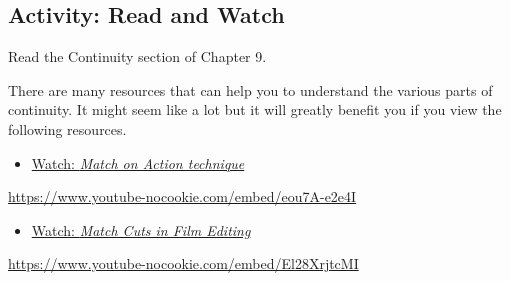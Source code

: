 \documentclass[
  letterpaper,
  DIV=11,
  numbers=noendperiod]{scrreprt}
\providecommand{\tightlist}{%
  \setlength{\itemsep}{0pt}\setlength{\parskip}{0pt}}\usepackage{longtable,booktabs,array}
\begin{document}
\subsection{Activity: Read and Watch}\label{activity-read-and-watch-1}

\begin{tcolorbox}[enhanced jigsaw, opacityback=0, colframe=quarto-callout-note-color-frame, leftrule=.75mm, arc=.35mm, rightrule=.15mm, colbacktitle=quarto-callout-note-color!10!white, titlerule=0mm, colback=white, toprule=.15mm, bottomtitle=1mm, breakable, toptitle=1mm, title={Learning Activity}, coltitle=black, bottomrule=.15mm, left=2mm, opacitybacktitle=0.6]

Read the Continuity section of Chapter 9.

There are many resources that can help you to understand the various
parts of continuity. It might seem like a lot but it will greatly
benefit you if you view the following resources.

\begin{itemize}
\tightlist
\item
  \href{https://www.youtube.com/watch?v=eou7A-e2e4I}{Watch: \emph{Match
  on Action technique}}
\end{itemize}

\url{https://www.youtube-nocookie.com/embed/eou7A-e2e4I}

\begin{itemize}
\tightlist
\item
  \href{https://www.youtube.com/watch?v=El28XrjtcMI}{Watch: \emph{Match
  Cuts in Film Editing}}
\end{itemize}

\url{https://www.youtube-nocookie.com/embed/El28XrjtcMI}

\end{tcolorbox}
\end{document}
